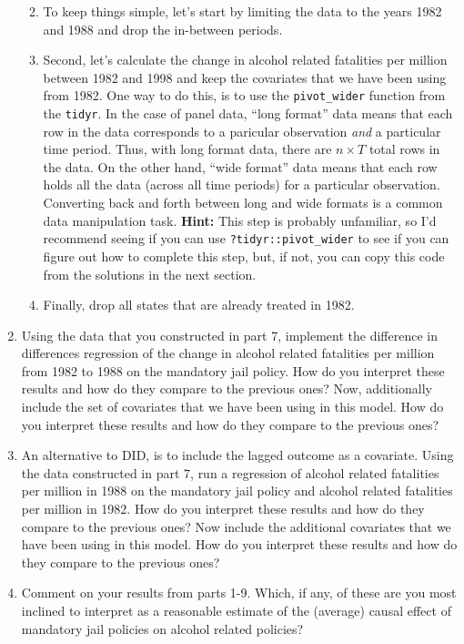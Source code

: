 \documentclass[
  letterpaper,
  DIV=11,
  numbers=noendperiod]{scrreprt}
\begin{document}
\begin{enumerate}
  \begin{enumerate}
  \def\labelenumii{\alph{enumii})}
  \item
    To keep things simple, let's start by limiting the data to the years
    1982 and 1988 and drop the in-between periods.
  \item
    Second, let's calculate the change in alcohol related fatalities per
    million between 1982 and 1998 and keep the covariates that we have
    been using from 1982. One way to do this, is to use the
    \texttt{pivot\_wider} function from the \texttt{tidyr}. In the case
    of panel data, ``long format'' data means that each row in the data
    corresponds to a paricular observation \emph{and} a particular time
    period. Thus, with long format data, there are \(n \times T\) total
    rows in the data. On the other hand, ``wide format'' data means that
    each row holds all the data (across all time periods) for a
    particular observation. Converting back and forth between long and
    wide formats is a common data manipulation task. \textbf{Hint:} This
    step is probably unfamiliar, so I'd recommend seeing if you can use
    \texttt{?tidyr::pivot\_wider} to see if you can figure out how to
    complete this step, but, if not, you can copy this code from the
    solutions in the next section.
  \item
    Finally, drop all states that are already treated in 1982.
  \end{enumerate}
\item
  Using the data that you constructed in part 7, implement the
  difference in differences regression of the change in alcohol related
  fatalities per million from 1982 to 1988 on the mandatory jail policy.
  How do you interpret these results and how do they compare to the
  previous ones? Now, additionally include the set of covariates that we
  have been using in this model. How do you interpret these results and
  how do they compare to the previous ones?
\item
  An alternative to DID, is to include the lagged outcome as a
  covariate. Using the data constructed in part 7, run a regression of
  alcohol related fatalities per million in 1988 on the mandatory jail
  policy and alcohol related fatalities per million in 1982. How do you
  interpret these results and how do they compare to the previous ones?
  Now include the additional covariates that we have been using in this
  model. How do you interpret these results and how do they compare to
  the previous ones?
\item
  Comment on your results from parts 1-9. Which, if any, of these are
  you most inclined to interpret as a reasonable estimate of the
  (average) causal effect of mandatory jail policies on alcohol related
  policies?
\end{enumerate}
\end{document}
